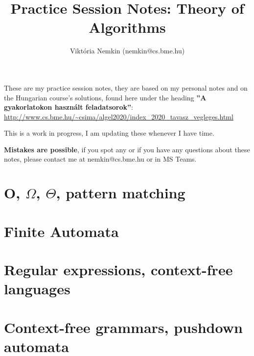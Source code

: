 \documentclass[14pt,a4paper]{article}
\author{Viktória Nemkin (nemkin@cs.bme.hu)}
\title{Practice Session Notes: Theory of Algorithms}
\date{}
\begin{document}
\maketitle

These are my practice session notes, they are based on my personal notes and on the Hungarian course's solutions, found here under the heading \textbf{''A gyakorlatokon használt feladatsorok''}:\\ \url{http://www.cs.bme.hu/~csima/algel2020/index_2020_tavasz_vegleges.html}

This is a work in progress, I am updating these whenever I have time.

\textbf{Mistakes are possible}, if you spot any or if you have any questions about these notes, please contact me at nemkin@cs.bme.hu or in MS Teams.

\tableofcontents
\pagebreak

\section{O, $\Omega$, $\Theta$, pattern matching}
\pagebreak
\pagebreak
\pagebreak
\pagebreak
\pagebreak
\pagebreak
\pagebreak
\pagebreak
\pagebreak
\pagebreak
\pagebreak
\pagebreak

\section{Finite Automata}
\pagebreak
\pagebreak
\pagebreak
\pagebreak
\pagebreak
\pagebreak
\pagebreak
\pagebreak
\pagebreak
\pagebreak
\pagebreak
\pagebreak
\pagebreak

\section{Regular expressions, context-free languages}
\pagebreak
\pagebreak
\pagebreak
\pagebreak
\pagebreak
\pagebreak
\pagebreak
\pagebreak
\pagebreak
\pagebreak
\pagebreak
\pagebreak

\section{Context-free grammars, pushdown automata}
\pagebreak
\pagebreak
\pagebreak
\pagebreak
\pagebreak
\pagebreak
\pagebreak
\pagebreak
\pagebreak
\pagebreak
\pagebreak
\pagebreak
\end{document}
